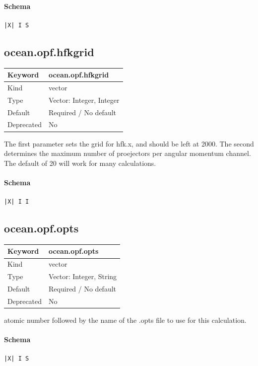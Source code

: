 \documentclass[11pt]{article}
\begin{document}
{{{{{\paragraph{Schema}
\begin{Verbatim}
|X| I S
\end{Verbatim}

\subsection{ocean.opf.hfkgrid}
\label{kw:ocean-opf-hfkgrid}
\begin{longtable}{|p{1.5in}|p{4.5in}|}
\hline
Keyword & ocean.opf.hfkgrid \\
\hline
Kind & vector \\
\hline
Type & Vector: Integer, Integer \\
\hline
Default & Required / No default \\
\hline
Deprecated & No \\
\hline
\end{longtable}
 The first parameter sets the grid for hfk.x, and should be left at 2000.
 The second determines the maximum number of proejectors per angular momentum
 channel. The default of 20 will work for many calculations.

\paragraph{Schema}
\begin{Verbatim}
|X| I I
\end{Verbatim}

\subsection{ocean.opf.opts}
\label{kw:ocean-opf-opts}
\begin{longtable}{|p{1.5in}|p{4.5in}|}
\hline
Keyword & ocean.opf.opts \\
\hline
Kind & vector \\
\hline
Type & Vector: Integer, String \\
\hline
Default & Required / No default \\
\hline
Deprecated & No \\
\hline
\end{longtable}
 atomic number followed by the name of the .opts file to use for this calculation.

\paragraph{Schema}
\begin{Verbatim}
|X| I S
\end{Verbatim}

}}}}}
\end{document}
